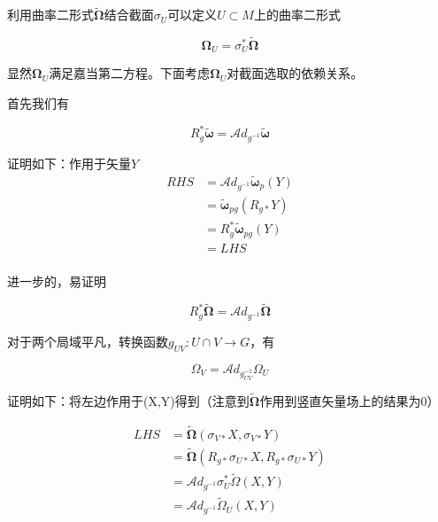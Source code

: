 \documentclass{ctexbook}
\begin{document}
利用曲率二形式$\tilde{\bm{\Omega}}$结合截面$\sigma_U$可以定义$U\subset M$上的曲率二形式

\begin{equation}
    \bm{\Omega}_U=\sigma_U^{*}\tilde{\bm{\Omega}}
\end{equation}

显然$\bm{\Omega}_U$满足嘉当第二方程。下面考虑$\bm{\Omega}_U$对截面选取的依赖关系。

首先我们有

\begin{equation}
    R_g^{*}\tilde{\bm{\omega}}=\mathscr{A}d_{g^{-1}}\tilde{\bm{\omega}}
\end{equation}

证明如下：作用于矢量$Y$
\begin{equation}
    \begin{split}
        RHS
        &=\mathscr{A}d_{g^{-1}}\tilde{\bm{\omega}}_p(Y)\\
        &=\tilde{\bm{\omega}}_{pg}(R_{g*}Y)\\
        &=R_g^{*}\tilde{\bm{\omega}}_{pg}(Y)\\
        &=LHS\\
    \end{split}
\end{equation}

进一步的，易证明

\begin{equation}
    R_g^{*}\tilde{\bm{\Omega}}=\mathscr{A}d_{g^{-1}}\tilde{\bm{\Omega}}
\end{equation}

对于两个局域平凡，转换函数$g_{UV}\colon U\cap V\to G$，有

\begin{equation}
    \Omega_V=\mathscr{A}d_{g_{UV}^{-1}}\Omega_U
\end{equation}

证明如下：将左边作用于(X,Y)得到（注意到$\tilde{\bm{\Omega}}$作用到竖直矢量场上的结果为0）

\begin{equation}
    \begin{split}
        LHS
        &=\tilde{\bm{\Omega}}(\sigma_{V*}X,\sigma_{V*}Y)\\
        &=\tilde{\bm{\Omega}}(R_{g*}\sigma_{U*}X,R_{g*}\sigma_{U*}Y)\\
        &=\mathscr{A}d_{g^{-1}}\sigma_U^{*}\tilde{\Omega}(X,Y)\\
        &=\mathscr{A}d_{g^{-1}}\tilde{\Omega}_{U}(X,Y)\\
    \end{split}
\end{equation}
\end{document}
